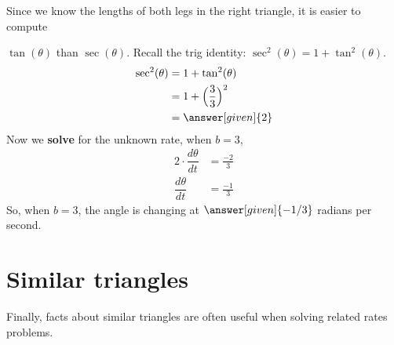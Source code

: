 \documentclass{ximera}
\begin{document}
\begin{example}
\begin{explanation}
\begin{image}
			\end{image}
			
			Since we know the lengths of both legs in the right triangle, it is easier to compute
			
			$\tan(\theta)$ than  $\sec(\theta)$. Recall the trig identity:  $ \sec^2(\theta)=1+  \tan^2(\theta)$.
			\begin{align*}
				\sec^2(\theta)&= 1+ \tan^2(\theta)\\
				&= 1+\Bigl(\frac{3}{3}\Bigr)^2\\
				&= \answer[given]{2}
			\end{align*}
			Now we \textbf{solve} for the unknown rate, when $b=3$,
			\begin{align*}
				2\cdot \dfrac{d\theta}{dt} &= \frac{-2}{3}\\
				\dfrac{d\theta}{dt}&= \frac{-1}{3}
			\end{align*}
			So, when $b=3$, the angle is changing at $\answer[given]{-1/3}$
			radians per second.
		\end{explanation}
	\end{example}
	
	
	
	\section{Similar triangles}
	
	Finally, facts about similar triangles are often useful when solving
	related rates problems.
	
\end{document}
